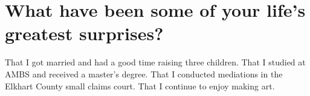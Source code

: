 \section{What have been some of your life's greatest surprises?}
That I got married and had a good time raising three children.
That I studied at AMBS and received a master's degree.
That I conducted mediations in the Elkhart County small claims court.
That I continue to enjoy making art.





